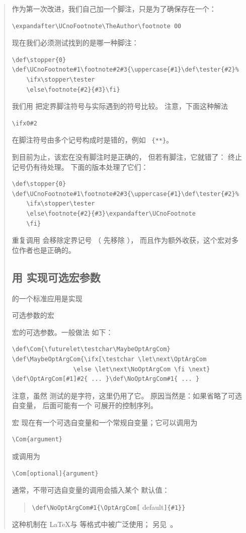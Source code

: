 \documentclass[a4paper]{rapport3}
\newenvironment{disp}{\begin{quotation}}{\end{quotation}}
\def\howto#1\par{}
\begin{document}
\begin{disp}
作为第一次改进，我们自己加一个脚注，只是为了确保存在一个：
\begin{verbatim}
\expandafter\UCnoFootnote\TheAuthor\footnote 00
\end{verbatim}
现在我们必须测试找到的是哪一种脚注：
\begin{verbatim}
\def\stopper{0}
\def\UCnoFootnote#1\footnote#2#3{\uppercase{#1}\def\tester{#2}%
    \ifx\stopper\tester
    \else\footnote{#2}{#3}\fi}
\end{verbatim}
我们用  把定界脚注符号与实际遇到的符号比较。
注意，下面这种解法
\begin{verbatim}
\ifx0#2
\end{verbatim}
在脚注符号由多个记号构成时是错的，例如 ~\verb>{**}>。

到目前为止，该宏在没有脚注时是正确的，
但若有脚注，它就错了：
终止记号仍有待处理。
下面的版本处理了它们：
\begin{verbatim}
\def\stopper{0}
\def\UCnoFootnote#1\footnote#2#3{\uppercase{#1}\def\tester{#2}%
    \ifx\stopper\tester
    \else\footnote{#2}{#3}\expandafter\UCnoFootnote
    \fi}
\end{verbatim}
重复调用  会移除定界记号
（ 先移除 ），
而且作为额外收获，这个宏对多位作者也是正确的。


\subsection{用 \protect{} 实现可选宏参数}

 的一个标准应用是实现
\howto 带可选参数的宏\par
宏的可选参数。一般做法
如下：
\begin{verbatim}
\def\Com{\futurelet\testchar\MaybeOptArgCom}
\def\MaybeOptArgCom{\ifx[\testchar \let\next\OptArgCom 
                 \else \let\next\NoOptArgCom \fi \next}
\def\OptArgCom[#1]#2{ ... }\def\NoOptArgCom#1{ ... }
\end{verbatim}
注意，虽然  测试的是字符，这里仍用了它。
原因当然是：如果省略了可选自变量， 后面可能有一个
可展开的控制序列。

宏  现在有一个可选自变量和一个常规自变量；它可以调用为 
\begin{verbatim}
\Com{argument}
\end{verbatim}
或调用为\begin{verbatim}
\Com[optional]{argument}
\end{verbatim}
通常，不带可选自变量的调用会插入某个
默认值：
\begin{disp}\verb>\def\NoOptArgCom#1{\OptArgCom[>%
{\italic default\/}\verb>]{#1}}>\end{disp}
这种机制在 \LaTeX 与 \LamsTeX 等格式中被广泛使用；
另见~\cite{svb:future}。




\end{disp}
\end{document}
